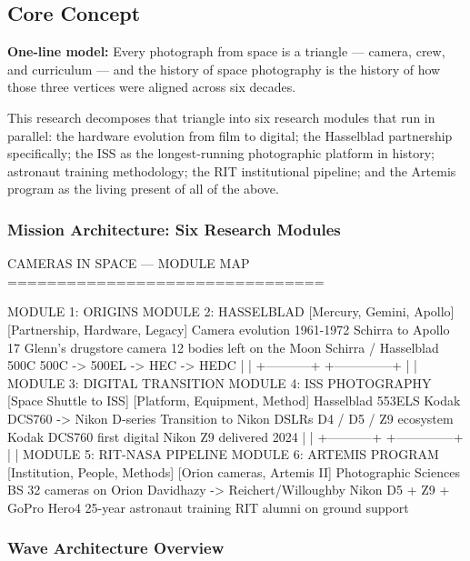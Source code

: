 \documentclass[11pt,letterpaper]{article}
\begin{document}
\subsection{Core Concept}

\textbf{One-line model:} Every photograph from space is a triangle --- camera, crew, and curriculum --- and the history of space photography is the history of how those three vertices were aligned across six decades.

This research decomposes that triangle into six research modules that run in parallel: the hardware evolution from film to digital; the Hasselblad partnership specifically; the ISS as the longest-running photographic platform in history; astronaut training methodology; the RIT institutional pipeline; and the Artemis program as the living present of all of the above.

\subsubsection{Mission Architecture: Six Research Modules}

\begin{asciibox}
CAMERAS IN SPACE --- MODULE MAP
================================

MODULE 1: ORIGINS            MODULE 2: HASSELBLAD
[Mercury, Gemini, Apollo]    [Partnership, Hardware, Legacy]
Camera evolution 1961-1972   Schirra to Apollo 17
Glenn's drugstore camera     12 bodies left on the Moon
Schirra / Hasselblad 500C    500C -> 500EL -> HEC -> HEDC
         |                              |
         +-----------+  +--------------+
                     |  |
MODULE 3: DIGITAL TRANSITION     MODULE 4: ISS PHOTOGRAPHY
[Space Shuttle to ISS]           [Platform, Equipment, Method]
Hasselblad 553ELS                Kodak DCS760 -> Nikon D-series
Transition to Nikon DSLRs        D4 / D5 / Z9 ecosystem
Kodak DCS760 first digital       Nikon Z9 delivered 2024
         |                              |
         +-----------+  +--------------+
                     |  |
MODULE 5: RIT-NASA PIPELINE      MODULE 6: ARTEMIS PROGRAM
[Institution, People, Methods]   [Orion cameras, Artemis II]
Photographic Sciences BS         32 cameras on Orion
Davidhazy -> Reichert/Willoughby Nikon D5 + Z9 + GoPro Hero4
25-year astronaut training       RIT alumni on ground support
\end{asciibox}

\subsubsection{Wave Architecture Overview}
\end{document}
